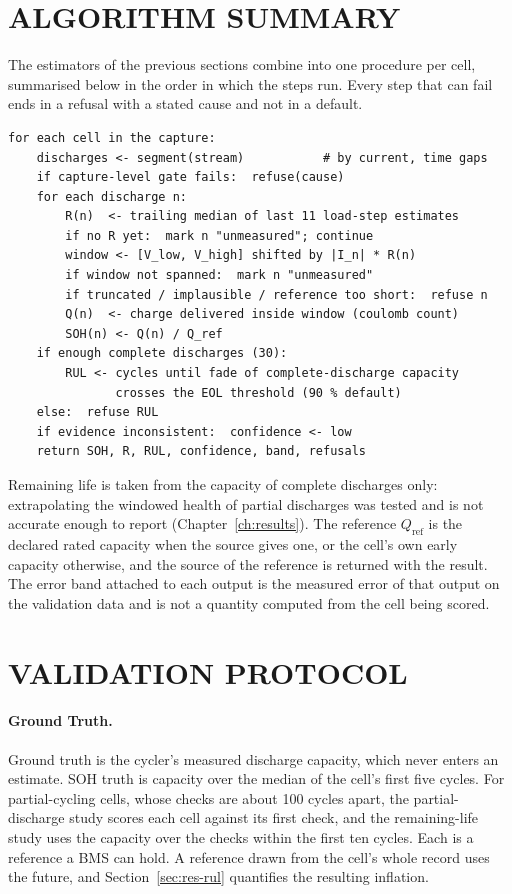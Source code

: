 \documentclass[12pt,a4paper]{amritareport}
\begin{document}
\section{ALGORITHM SUMMARY}

The estimators of the previous sections combine into one procedure per cell, summarised below in the order in which the steps run. Every step that can fail ends in a refusal with a stated cause and not in a default.

\begin{footnotesize}
\begin{verbatim}
for each cell in the capture:
    discharges <- segment(stream)           # by current, time gaps
    if capture-level gate fails:  refuse(cause)
    for each discharge n:
        R(n)  <- trailing median of last 11 load-step estimates
        if no R yet:  mark n "unmeasured"; continue
        window <- [V_low, V_high] shifted by |I_n| * R(n)
        if window not spanned:  mark n "unmeasured"
        if truncated / implausible / reference too short:  refuse n
        Q(n)  <- charge delivered inside window (coulomb count)
        SOH(n) <- Q(n) / Q_ref
    if enough complete discharges (30):
        RUL <- cycles until fade of complete-discharge capacity
               crosses the EOL threshold (90 % default)
    else:  refuse RUL
    if evidence inconsistent:  confidence <- low
    return SOH, R, RUL, confidence, band, refusals
\end{verbatim}
\end{footnotesize}

Remaining life is taken from the capacity of complete discharges only: extrapolating the windowed health of partial discharges was tested and is not accurate enough to report (Chapter~\ref{ch:results}). The reference $Q_{\mathrm{ref}}$ is the declared rated capacity when the source gives one, or the cell's own early capacity otherwise, and the source of the reference is returned with the result. The error band attached to each output is the measured error of that output on the validation data and is not a quantity computed from the cell being scored.

\section{VALIDATION PROTOCOL}
\label{sec:protocol}

\paragraph{Ground Truth.} Ground truth is the cycler's measured discharge capacity, which never enters an estimate. SOH truth is capacity over the median of the cell's first five cycles. For partial-cycling cells, whose checks are about 100 cycles apart, the partial-discharge study scores each cell against its first check, and the remaining-life study uses the capacity over the checks within the first ten cycles. Each is a reference a BMS can hold. A reference drawn from the cell's whole record uses the future, and Section~\ref{sec:res-rul} quantifies the resulting inflation.
\end{document}

